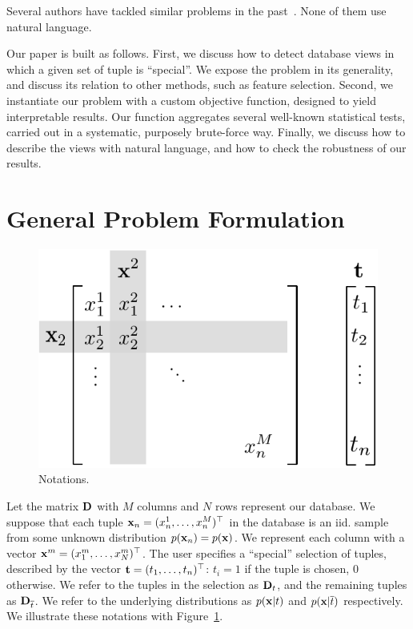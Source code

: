 Several authors have tackled similar problems in the
past~\cite{angiulli2009detecting, knorr1999finding, loekito2008mining,
webb2008detecting}. None of them use natural language.

Our paper is built as follows. First, we discuss how to detect database views
in which a given set of tuple is ``special''. We expose the problem in its
generality, and discuss its relation to other methods, such as feature
selection. Second, we instantiate our problem with a custom objective function,
designed to yield interpretable results. Our function aggregates several
well-known statistical tests, carried out in a systematic, purposely
brute-force way.  Finally, we discuss how to describe the views with natural
language, and how to check the robustness of our results.

\section{General Problem Formulation}
\label{sec:problem}

\begin{figure}
  \centering
  \includegraphics[width=0.6\columnwidth]{Figures/Notations}
  \caption{Notations.}
  \label{pic:notations}
\end{figure}
Let the matrix $\mathbf{D}$ with $M$ columns and $N$ rows represent our database.
We suppose that each tuple $\mathbf{x}_n = (x^1_n, \dots, x^M_n)^\top$ in the
database is an iid. sample from some unknown distribution
$p(\mathbf{x}_n)=p(\mathbf{x})$. We represent each column with a vector $\mathbf{x}^{m}=
(x^m_1, \dots, x^m_N)^\top$.  The user specifies a ``special'' selection of
tuples, described by the vector $\mathbf{t} = (t_1, \ldots, t_n)^\top$: $t_i=1$ if
the tuple is chosen, 0 otherwise. We refer to the tuples in the selection as
${\mathbf{D}}_t$, and the remaining tuples as ${\mathbf{D}}_{\overline{t}}$. We refer
to the underlying distributions as $p(\mathbf{x}|t)$ and $p(\mathbf{x}|\overline{t})$
respectively. We illustrate these notations with Figure~\ref{pic:notations}.


